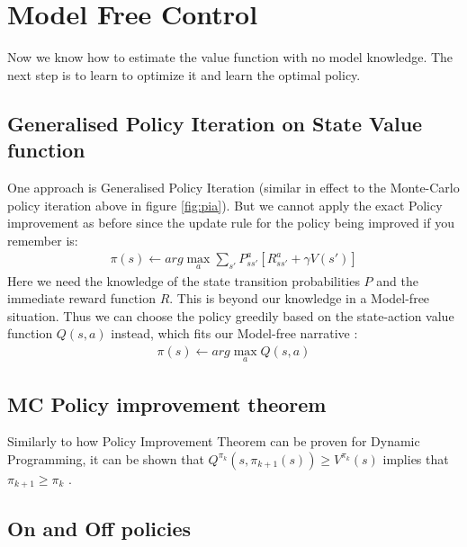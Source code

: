 \section{Model Free Control }
Now we know how to estimate the value function with no model knowledge. The next step is to learn to optimize it and learn the optimal policy. 


\subsection{Generalised Policy Iteration on State Value function} 
One approach is Generalised Policy Iteration (similar in effect to the Monte-Carlo policy iteration above in figure \ref{fig:pia}). But we cannot apply the exact Policy improvement as before since the update rule for the policy being improved if you remember is: 
\begin{align}
    \pi(s) \leftarrow arg \max_{a} \sum_{s'} P^{a}_{ss'} [R^{a}_{ss'} + \gamma V(s')]
\end{align}
Here we need the knowledge of the state transition probabilities $P$ and the immediate reward function $R$. This is beyond our knowledge in a Model-free situation. Thus we can choose the policy greedily based on the state-action value function $Q(s, a)$ instead, which fits our Model-free narrative \cite{lecture_mfc}:  
\begin{align}
    \pi(s) \leftarrow arg \max_{a} Q(s, a) 
\end{align}
\subsection{MC Policy improvement theorem}

Similarly to how Policy Improvement Theorem can be proven for Dynamic Programming, it can be shown that $Q^{\pi_k}(s, \pi_{k+1}(s)) \geq V^{\pi_k}(s)$ implies that $\pi_{k+1} \geq \pi_k$ \cite{lecture_mfc}. 

\subsection{On and Off policies}

